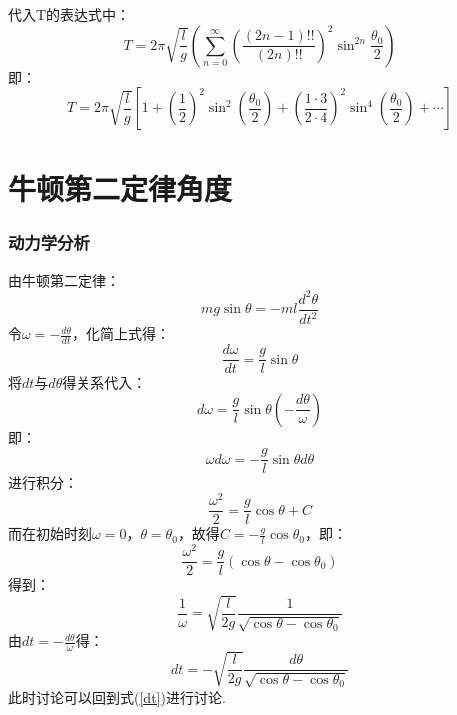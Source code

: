 \documentclass{jams-l}
\theoremstyle{definition}
\theoremstyle{remark}
\numberwithin{equation}{section}
\begin{document}
代入T的表达式中：
\begin{equation}
    T=2\pi \sqrt{\frac{l}{g}}\left(\sum_{n=0}^{\infty}\left( \frac{(2n-1)!!}{(2n)!!} \right)^2 \sin ^{2n}\frac{\theta_0}{2} \right)
\end{equation}
即：
\begin{equation}\label{final}
    T=2\pi\sqrt{\frac{l}{g}}\left[1+\left(\frac{1}{2}\right)^2 \sin^2 \left(\frac{\theta_0}{2}\right)+\left(\frac{1 \cdot 3}{2 \cdot 4} \right)^2 \sin^4 \left(\frac{\theta_0}{2}\right)+\cdots \right]
\end{equation}











\part{牛顿第二定律角度}

\section{动力学分析}
由牛顿第二定律：
\begin{equation}\label{nt2}
    mg\sin \theta=-ml\frac{d^2\theta}{dt^2}
\end{equation}
令$\omega=-\frac{d\theta}{dt}$，化简上式得：
\begin{equation}
    \frac{d\omega}{dt}=\frac{g}{l}\sin \theta
\end{equation}
将$dt$与$d\theta$得关系代入：
\begin{equation}
    d\omega=\frac{g}{l}\sin \theta \left(-\frac{d\theta}{\omega}\right)
\end{equation}
即：
\begin{equation}
    \omega d \omega=-\frac{g}{l} \sin \theta d\theta
\end{equation}
进行积分：
\begin{equation}
    \frac{\omega^2}{2}=\frac{g}{l}\cos \theta+C
\end{equation}
而在初始时刻$\omega=0$，$\theta=\theta_0$，故得$C=-\frac{g}{l} \cos\theta_0$，即：
\begin{equation}
    \frac{\omega^2}{2}=\frac{g}{l}(\cos \theta-\cos \theta_0)
\end{equation}
得到：
\begin{equation}
    \frac{1}{\omega}=\sqrt{\frac{l}{2g}}\frac{1}{\sqrt{\cos \theta-\cos \theta_0}}
\end{equation}
由$dt=-\frac{d\theta}{\omega}$得：
\begin{equation}
    dt=-\sqrt{\frac{l}{2g}}\frac{d\theta}{\sqrt{\cos \theta-\cos \theta_0}}
\end{equation}
此时讨论可以回到式(\ref{dt})进行讨论.
\end{document}
